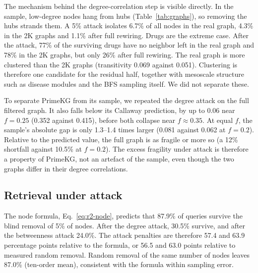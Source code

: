 The mechanism behind the degree-correlation step is visible directly. In the
sample, low-degree nodes hang from hubs (Table~\ref{tab:graphs}), so removing
the hubs strands them. A 5\% attack isolates 6.7\% of all nodes in the real
graph, 4.3\% in the 2K graphs and 1.1\% after full rewiring. Drugs are the
extreme case. After the attack, 77\% of the surviving drugs have no neighbor
left in the real graph and 78\% in the 2K graphs, but only 26\% after full
rewiring. The real graph is more clustered than
the 2K graphs (transitivity 0.069 against 0.051). Clustering is therefore one
candidate for the residual half, together with mesoscale structure such as
disease modules and the BFS sampling itself. We did not separate these.

To separate PrimeKG from its sample, we repeated the degree attack on the full
filtered graph. It also falls below its Callaway prediction, by up to 0.06 near
$f=0.25$ (0.352 against 0.415), before both collapse near $f\approx0.35$. At equal
$f$, the sample's absolute gap is only 1.3--1.4 times larger (0.081 against
0.062 at $f=0.2$). Relative to the predicted value, the full graph is as fragile
or more so (a 12\% shortfall against 10.5\% at $f=0.2$). The excess fragility
under attack is therefore a property of PrimeKG, not an artefact of the sample,
even though the two graphs differ in their degree correlations.

\subsection{Retrieval under attack}
\label{sec:targeted-retrieval}

The node formula, Eq.~\eqref{eq:r2-node}, predicts that 87.9\% of queries
survive the blind removal of 5\% of nodes. After the
degree attack, 30.5\% survive, and after the betweenness attack 24.0\%. The
attack penalties are therefore 57.4 and 63.9 percentage points relative to the
formula, or 56.5 and 63.0 points relative to measured random removal. Random removal of
the same number of nodes leaves 87.0\% (ten-order mean), consistent with the
formula within sampling error.

